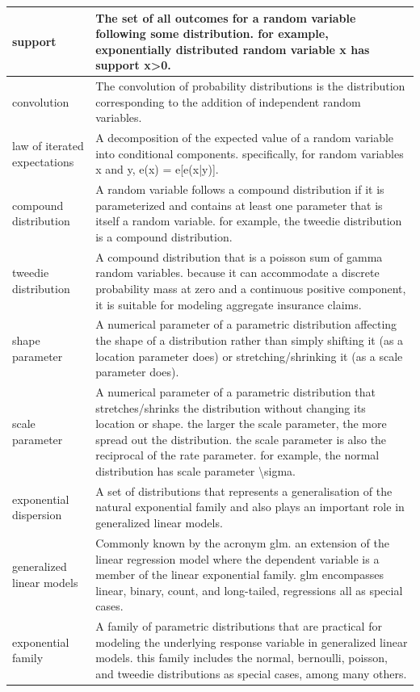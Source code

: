 \documentclass[
]{book}
\begin{document}
\begin{longtable}{>{\raggedright\arraybackslash}p{10em}|>{\raggedright\arraybackslash}p{30em}}
\hline
support & The set of all outcomes for a random variable following some distribution. for example, exponentially distributed random variable x has support x>0.\\
\hline
convolution & The convolution of probability distributions is the distribution corresponding to the addition of independent random variables.\\
\hline
law of iterated expectations & A decomposition of the expected value of a random variable into conditional components. specifically, for random variables x and y, e(x) = e[e(x|y)].\\
\hline
compound distribution & A random variable follows a compound distribution if it is parameterized and contains at least one parameter that is itself a random variable. for example, the tweedie distribution is a compound distribution.\\
\hline
tweedie distribution & A compound distribution that is a poisson sum of gamma random variables. because it can accommodate a discrete probability mass at zero and a continuous positive component, it is suitable for modeling aggregate insurance claims.\\
\hline
shape parameter & A numerical parameter of a parametric distribution affecting the shape of a distribution rather than simply shifting it (as a location parameter does) or stretching/shrinking it (as a scale parameter does).\\
\hline
scale parameter & A numerical parameter of a parametric distribution that stretches/shrinks the distribution without changing its location or shape. the larger the scale parameter, the more spread out the distribution. the scale parameter is also the reciprocal of the rate parameter. for example, the normal distribution has scale parameter \textbackslash{}sigma.\\
\hline
exponential dispersion & A set of distributions that represents a generalisation of the natural exponential family and also plays an important role in generalized linear models.\\
\hline
generalized linear models & Commonly known by the acronym glm. an extension of the linear regression model where the dependent variable is a member of the linear exponential family. glm encompasses linear, binary, count, and long-tailed, regressions all as special cases.\\
\hline
exponential family & A family of parametric distributions that are practical for modeling the underlying response variable in generalized linear models. this family includes the normal, bernoulli, poisson, and tweedie distributions as special cases, among many others.\\

\end{longtable}
\end{document}
